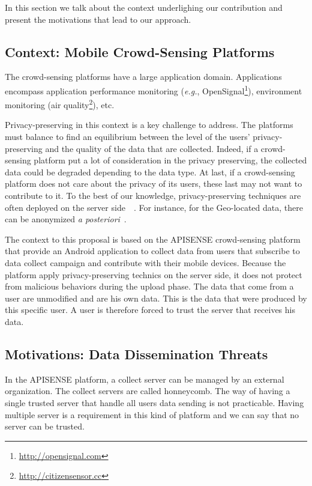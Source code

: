 
In this section we talk about the context underlighing our contribution and present the motivations that lead to our approach.

\subsection{Context: Mobile Crowd-Sensing Platforms}

The crowd-sensing platforms have a large application domain.
Applications encompass application performance monitoring (\emph{e.g.}, OpenSignal\footnote{\url{http://opensignal.com}}), environment monitoring (air quality\footnote{\url{http://citizensensor.cc}}), etc.

Privacy-preserving in this context is a key challenge to address.
The platforms must balance to find an equilibrium between the level of the users' privacy-preserving and the quality of the data that are collected.
Indeed, if a crowd-sensing platform put a lot of consideration in the privacy preserving, the collected data could be degraded depending to the data type.
At last, if a crowd-sensing platform does not care about the privacy of its users, these last may not want to contribute to it.
To the best of our knowledge, privacy-preserving techniques are often deployed on the server side~\cite{DBLP:conf/mobisys/CorneliusKKPST08}~\cite{DBLP:conf/dais/HadererRS13}.
For instance, for the Geo-located data, there can be anonymized \emph{a posteriori}~\cite{DBLP:conf/icdcs/PrimaultMB15}.

The context to this proposal is based on the APISENSE crowd-sensing platform that provide an Android application to collect data from users that subscribe to data collect campaign and contribute with their mobile devices.
Because the platform apply privacy-preserving technics on the server side, it does not protect from malicious behaviors during the upload phase.
The data that come from a user are unmodified and are his own data.
This is the data that were produced by this specific user.
A user is therefore forced to trust the server that receives his data.

\subsection{Motivations: Data Dissemination Threats}

In the APISENSE platform, a collect server can be managed by an external organization.
The collect servers are called honneycomb.
The way of having a single trusted server that handle all users data sending is not practicable.
Having multiple server is a requirement in this kind of platform and we can say that no server can be trusted.

